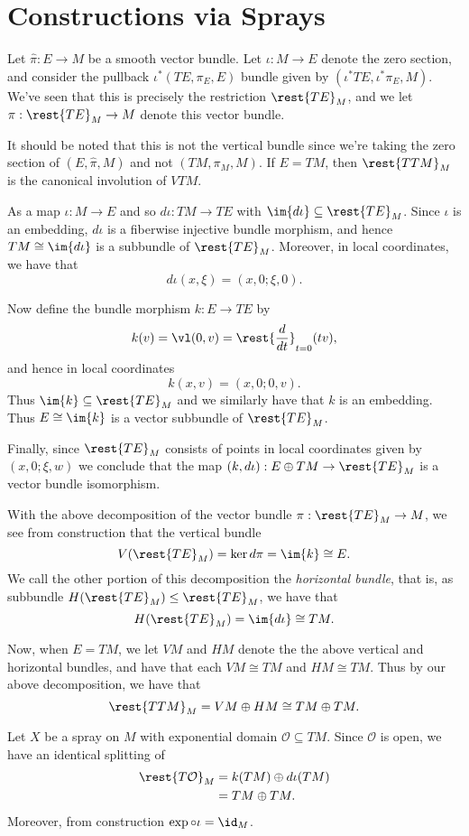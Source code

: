 



\section{Constructions via Sprays}

Let $\hat{\pi}:E\to M$ be a smooth vector bundle.  Let $\iota:M\to E$ denote the zero section, and consider the pullback $\iota^*(TE,\pi_E,E)$ bundle given by $(\iota^*TE,\iota^*\pi_E,M)$.  We've seen that this is precisely the restriction $\rest{TE}_M$, and we let $\pi:\rest{TE}_M\to M$ denote this vector bundle.

It should be noted that this is not the vertical bundle since we're taking the zero section of $(E,\hat{\pi},M)$ and not $(TM,\pi_M,M)$.  If $E=TM$, then $\rest{TTM}_M$ is the canonical involution of $VTM$.

As a map $\iota:M\to E$ and so $d\iota:TM\to TE$ with $\im{d\iota}\subseteq\rest{TE}_M$.  Since $\iota$ is an embedding, $d\iota$ is a fiberwise injective bundle morphism, and hence $TM\cong\im{d\iota}$ is a subbundle of $\rest{TE}_M$.  Moreover, in local coordinates, we have that
$$d\iota(x,\xi)=(x,0;\xi,0).$$

Now define the bundle morphism $k:E\to TE$ by
$$k(v)=\vl(0,v)=\rest{\frac{d}{dt}}_{t=0}(tv),$$
and hence in local coordinates
$$k(x,v)=(x,0;0,v).$$
Thus $\im{k}\subseteq\rest{TE}_M$ and we similarly have that $k$ is an embedding.  Thus $E\cong\im{k}$ is a vector subbundle of $\rest{TE}_M$.

Finally, since $\rest{TE}_M$ consists of points in local coordinates given by $(x,0;\xi,w)$ we conclude that the map $(k,d\iota):E\oplus TM\to\rest{TE}_M$ is a vector bundle isomorphism.

With the above decomposition of the vector bundle $\pi:\rest{TE}_M\to M$, we see from construction that the vertical bundle
$$V(\rest{TE}_M)=\ker{d\pi}=\im{k}\cong E.$$
We call the other portion of this decomposition the \textit{horizontal bundle}, that is, as subbundle $H(\rest{TE}_M)\leq\rest{TE}_M$, we have that
$$H(\rest{TE}_M)=\im{d\iota}\cong TM.$$

Now, when $E=TM$, we let $VM$ and $HM$ denote the the above vertical and horizontal bundles, and have that each $VM\cong TM$ and $HM\cong TM$.  Thus by our above decomposition, we have that
$$\rest{TTM}_M=VM\oplus HM\cong TM\oplus TM.$$


Let $X$ be a spray on $M$ with exponential domain $\mathcal{O}\subseteq TM$.  Since $\mathcal{O}$ is open, we have an identical splitting of
\begin{align*}
	\rest{T\mathcal{O}}_M&=k(TM)\oplus d\iota(TM)\\
	&=TM\oplus TM.
\end{align*}
Moreover, from construction $\exp\circ\iota=\id_M$.

